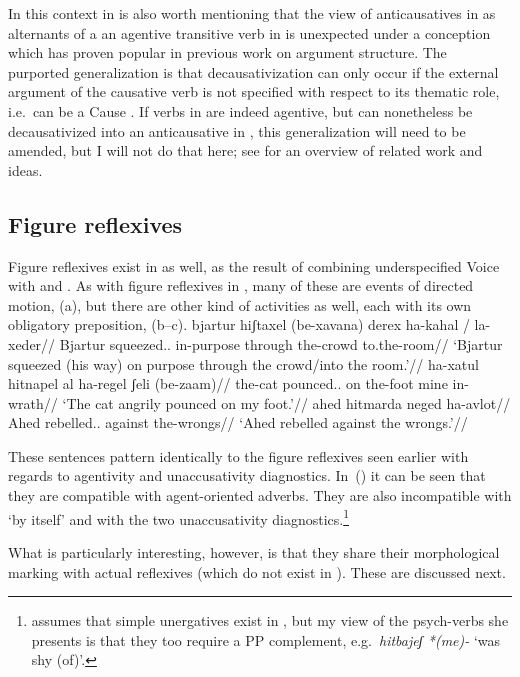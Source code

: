 {{In this context in is also worth mentioning that the view of anticausatives in {\thit} as alternants of a an agentive transitive verb in {\tpie} is unexpected under a conception which has proven popular in previous work on argument structure. The purported generalization is that decausativization can only occur if the external argument of the causative verb is not specified with respect to its thematic role, i.e.~can be a Cause \citep{unaccusativity95,reinhart02}. If verbs in {\tpie} are indeed agentive, but can nonetheless be decausativized into an anticausative in {\thit}, this generalization will need to be amended, but I will not do that here; see \citet[52]{layering15} for an overview of related work and ideas.

	\subsection{Figure reflexives} \label{vz:thit:figrefl}
Figure reflexives exist in {\thit} as well, as the result of combining underspecified Voice with {\va} and {\pz}. As with figure reflexives in {\tnif}, many of these are events of directed motion, (\nextx a), but there are other kind of activities as well, each with its own obligatory preposition, (\nextx b--c).
\pex
	\a \begingl
		\gla bjartur hiʃtaxel (be-xavana) derex ha-kahal / la-xeder//
		\glb Bjartur squeezed.. in-purpose through the-crowd {} to.the-room//
		\glft `Bjartur squeezed (his way) on purpose through the crowd/into the room.'//
		\endgl
	\a \begingl
		\gla ha-xatul hitnapel al ha-regel ʃeli (be-zaam)//
		\glb the-cat pounced.. on the-foot mine in-wrath//
		\glft `The cat angrily pounced on my foot.'//
		\endgl
	\a \begingl
		\gla ahed hitmarda neged ha-avlot//
		\glb Ahed rebelled.. against the-wrongs//
		\glft `Ahed rebelled against the wrongs.'//
		\endgl
\xe

These sentences pattern identically to the figure reflexives seen earlier with regards to agentivity and unaccusativity diagnostics. In~(\lastx) it can be seen that they are compatible with agent-oriented adverbs. They are also incompatible with `by itself' and with the two unaccusativity diagnostics.\footnote{\cite{siloni08} assumes that simple unergatives exist in {\thit}, but my view of the psych-verbs she presents is that they too require a PP complement, e.g.~\emph{hitbajeʃ *(me)-} `was shy (of)'.}

What is particularly interesting, however, is that they share their morphological marking with actual reflexives (which do not exist in {\tnif}). These are discussed next.


}}
